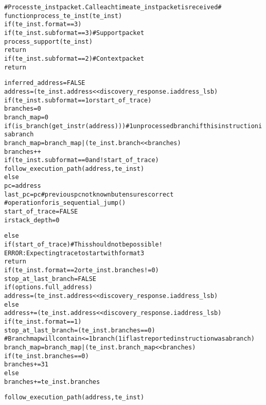 \begin{alltt}
# Process te_inst packet.  Call each time a te_inst packet is received #
function process_te_inst (te_inst)
  if (te_inst.format == 3)
    if (te_inst.subformat == 3) # Support packet
      process_support(te_inst)
      return
    if (te_inst.subformat == 2) # Context packet
      return

    inferred_address = FALSE
    address       = (te_inst.address << discovery_response.iaddress_lsb)
    if (te_inst.subformat == 1 or start_of_trace)
      branches    = 0
      branch_map  = 0
    if (is_branch(get_instr(address))) # 1 unprocessed branch if this instruction is a branch
      branch_map = branch_map | (te_inst.branch << branches)
      branches++
    if (te_inst.subformat == 0 and !start_of_trace)
      follow_execution_path(address, te_inst)
    else
      pc           = address
      last_pc      = pc # previous pc not known but ensures correct
                        #  operation for is_sequential_jump()
    start_of_trace = FALSE
    irstack_depth  = 0

  else
    if (start_of_trace) # This should not be possible!
      ERROR: Expecting trace to start with format 3
      return
    if (te_inst.format == 2 or te_inst.branches != 0)
      stop_at_last_branch = FALSE
      if (options.full_address)
        address  = (te_inst.address << discovery_response.iaddress_lsb)
      else
        address += (te_inst.address << discovery_response.iaddress_lsb)
    if (te_inst.format == 1)
      stop_at_last_branch = (te_inst.branches == 0)
      # Branch map will contain <= 1 branch (1 if last reported instruction was a branch)
      branch_map = branch_map | (te_inst.branch_map << branches)
      if (te_inst.branches == 0)
        branches += 31
      else
        branches += te_inst.branches

    follow_execution_path(address, te_inst)
\end{alltt}

\pagebreak

